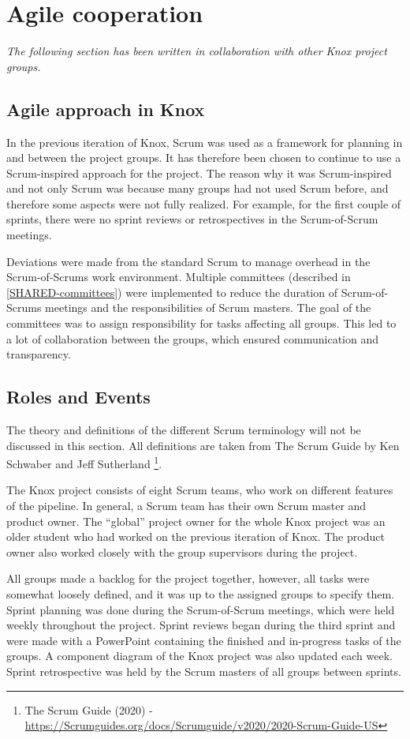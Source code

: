 \section{Agile cooperation}\label{knox_collaboration}
\textit{The following section has been written in collaboration with other Knox project groups.}


\subsection{Agile approach in Knox}\label{common_agile_methods}
In the previous iteration of Knox, Scrum was used as a framework for planning in and between the project groups. It has therefore been chosen to continue to use a Scrum-inspired approach for the project. The reason why it was Scrum-inspired and not only Scrum was because many groups had not used Scrum before, and therefore some aspects were not fully realized. For example, for the first couple of sprints, there were no sprint reviews or retrospectives in the Scrum-of-Scrum meetings.  

Deviations were made from the standard Scrum to manage overhead in the Scrum-of-Scrums work environment. Multiple committees (described in \autoref{SHARED-committees}) were implemented to reduce the duration of Scrum-of-Scrums meetings and the responsibilities of Scrum masters. The goal of the committees was to assign responsibility for tasks affecting all groups.
This led to a lot of collaboration between the groups, which ensured communication and transparency. 

\subsection{Roles and Events}\label{roles_and_events}
The theory and definitions of the different Scrum terminology will not be discussed in this section. All definitions are taken from The Scrum Guide by Ken Schwaber and Jeff Sutherland
\footnote{The Scrum Guide (2020) - \url{https://Scrumguides.org/docs/Scrumguide/v2020/2020-Scrum-Guide-US}}.


The Knox project consists of eight Scrum teams, who work on different features of the pipeline. In general, a Scrum team has their own Scrum master and product owner. The “global” project owner for the whole Knox project was an older student who had worked on the previous iteration of Knox. The product owner also worked closely with the group supervisors during the project.

All groups made a backlog for the project together, however, all tasks were somewhat loosely defined, and it was up to the assigned groups to specify them. Sprint planning was done during the Scrum-of-Scrum meetings, which were held weekly throughout the project. Sprint reviews began during the third sprint and were made with a PowerPoint containing the finished and in-progress tasks of the groups. A component diagram of the Knox project was also updated each week. Sprint retrospective was held by the Scrum masters of all groups between sprints.

